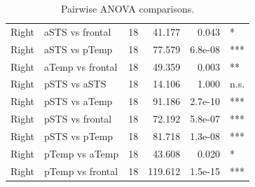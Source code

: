 \begin{table}[h]
\begin{tabular}{llrrrl}
 Right        & aSTS vs frontal  &   18 &   41.177 &     0.043 & *      \\
 Right        & aSTS vs pTemp    &   18 &   77.579 &   6.8e-08 & ***    \\
 Right        & aTemp vs frontal &   18 &   49.359 &     0.003 & **     \\
 Right        & pSTS vs aSTS     &   18 &   14.106 &     1.000 & n.s.   \\
 Right        & pSTS vs aTemp    &   18 &   91.186 &   2.7e-10 & ***    \\
 Right        & pSTS vs frontal  &   18 &   72.192 &   5.8e-07 & ***    \\
 Right        & pSTS vs pTemp    &   18 &   81.718 &   1.3e-08 & ***    \\
 Right        & pTemp vs aTemp   &   18 &   43.608 &     0.020 & *      \\
 Right        & pTemp vs frontal &   18 &  119.612 &   1.5e-15 & ***    \\
\bottomrule
\end{tabular}
\caption{Pairwise ANOVA comparisons.}
\end{table}